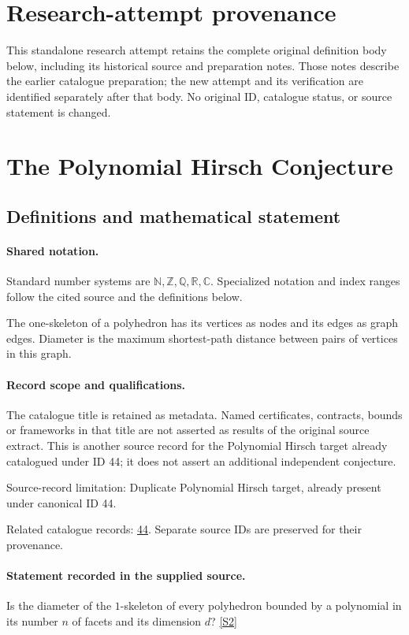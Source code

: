 \documentclass[11pt]{article}
\begin{document}
\section*{Research-attempt provenance}
This standalone research attempt retains the complete original definition body below,
including its historical source and preparation notes. Those notes describe the
earlier catalogue preparation; the new attempt and its verification are identified
separately after that body. No original ID, catalogue status, or source statement is changed.

\section{The Polynomial Hirsch Conjecture}\label{statement}

\subsection{Definitions and mathematical statement}

\paragraph{Shared notation.}Standard number systems are $\mathbb N,\mathbb Z,\mathbb Q,\mathbb R,\mathbb C$. Specialized notation and index ranges follow the cited source and the definitions below.


The one-skeleton of a polyhedron has its vertices as nodes and its edges as graph edges. Diameter is the maximum shortest-path distance between pairs of vertices in this graph.
\paragraph{Record scope and qualifications.}
The catalogue title is retained as metadata. Named certificates, contracts, bounds or frameworks in that title are not asserted as results of the original source extract.
This is another source record for the Polynomial Hirsch target already catalogued under ID 44; it does not assert an additional independent conjecture.

Source-record limitation: Duplicate Polynomial Hirsch target, already present under canonical ID 44.

Related catalogue records: \href{https://mehmetmars7.github.io/Erdosproblems-llm-hunter/problem.html?type=open_problems&id=44}{44}. Separate source IDs are preserved for their provenance.
\paragraph{Statement recorded in the supplied source.}
Is the diameter of the $1$-skeleton of every polyhedron bounded by a polynomial in its number $n$ of facets and its dimension $d$? \href{https://doi.org/10.4171/owr/2018/50}{[S2]}
\end{document}
